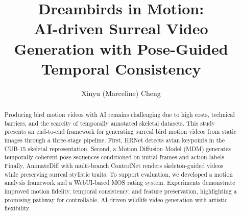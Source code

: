 \documentclass[final-report]{report-template}
\title{Dreambirds in Motion:\\ 
AI-driven Surreal Video Generation with Pose-Guided Temporal Consistency}
\author{Xinyu (Marceline) Cheng}
\begin{document}
\maketitlepage 

\tableofcontents  
\newpage         




\begin{abstract}
Producing bird motion videos with AI remains challenging due to high costs, technical barriers, and the scarcity of temporally annotated skeletal datasets. This study presents an end-to-end framework for generating surreal bird motion videos from static images through a three-stage pipeline. First, HRNet detects avian keypoints in the CUB-15 skeletal representation. Second, a Motion Diffusion Model (MDM) generates temporally coherent pose sequences conditioned on initial frames and action labels. Finally, AnimateDiff with multi-branch ControlNet renders skeleton-guided videos while preserving surreal stylistic traits. To support evaluation, we developed a motion analysis framework and a WebUI-based MOS rating system. Experiments demonstrate improved motion fidelity, temporal consistency, and feature preservation, highlighting a promising pathway for controllable, AI-driven wildlife video generation with artistic flexibility.
\end{abstract}
\end{document}
